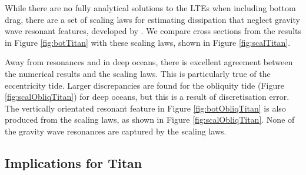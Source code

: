 While there are no fully analytical solutions to the LTEs when including bottom drag, there are a set of scaling laws for estimating dissipation that neglect gravity wave resonant features, developed by \citet{chen2013tidal}. We compare cross sections from the results in Figure \ref{fig:botTitan} with these scaling laws, shown in Figure \ref{fig:scalTitan}.

Away from resonances and in deep oceans, there is excellent agreement between the numerical results and the scaling laws. This is particularly true of the eccentricity tide. Larger discrepancies are found for the obliquity tide (Figure \ref{fig:scalObliqTitan}) for deep oceans, but this is a result of discretisation error. The vertically orientated resonant feature in Figure \ref{fig:botObliqTitan} is also produced from the scaling laws, as shown in Figure \ref{fig:scalObliqTitan}. None of the gravity wave resonances are captured by the scaling laws. 

\subsection{Implications for Titan}

